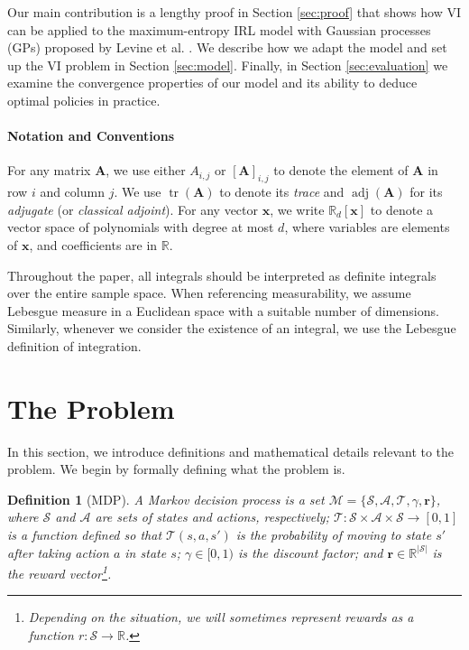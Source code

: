 \documentclass{mpaper}
\newtheorem{definition}[theorem]{Definition}
\DeclareMathOperator{\adj}{adj}
\DeclareMathOperator{\tr}{tr}
\begin{document}
Our main contribution is a lengthy proof in Section \ref{sec:proof} that shows
how VI can be applied to the maximum-entropy IRL model with Gaussian processes
(GPs) proposed by Levine et al. \cite{DBLP:conf/nips/LevinePK11}. We describe
how we adapt the model and set up the VI problem in Section \ref{sec:model}.
Finally, in Section \ref{sec:evaluation} we examine the convergence properties
of our model and its ability to deduce optimal policies in practice.

\paragraph{Notation and Conventions}

For any matrix $\mathbf{A}$, we use either $A_{i,j}$ or
$[\mathbf{A}]_{i,j}$ to denote the element of $\mathbf{A}$ in row $i$ and column
$j$. We use $\tr(\mathbf{A})$ to denote its \emph{trace} and $\adj(\mathbf{A})$
for its \emph{adjugate} (or \emph{classical adjoint}). For any vector
$\mathbf{x}$, we write $\mathbb{R}_d[\mathbf{x}]$ to denote a vector space of
polynomials with degree at most $d$, where variables are elements of
$\mathbf{x}$, and coefficients are in $\mathbb{R}$.

Throughout the paper, all integrals should be interpreted as definite integrals
over the entire sample space. When referencing measurability, we assume Lebesgue
measure in a Euclidean space with a suitable number of dimensions. Similarly,
whenever we consider the existence of an integral, we use the Lebesgue
definition of integration.

\section{The Problem} \label{sec:problem}

In this section, we introduce definitions and mathematical details relevant to
the problem. We begin by formally defining what the problem is.

\begin{definition}[MDP]
  A \emph{Markov decision process} is a set $\mathcal{M} = \{ \mathcal{S},
  \mathcal{A}, \mathcal{T}, \gamma, \mathbf{r} \}$, where $\mathcal{S}$ and
  $\mathcal{A}$ are sets of states and actions, respectively; $\mathcal{T} :
  \mathcal{S} \times \mathcal{A} \times \mathcal{S} \to [0, 1]$ is a function
  defined so that $\mathcal{T}(s, a, s')$ is the probability of moving to state
  $s'$ after taking action $a$ in state $s$; $\gamma \in [0, 1)$ is the discount
  factor; and $\mathbf{r} \in \mathbb{R}^{|\mathcal{S}|}$ is the reward
  vector\footnote{Depending on the situation, we will sometimes represent
    rewards as a function $r : \mathcal{S} \to \mathbb{R}$.}.
\end{definition}
\end{document}
